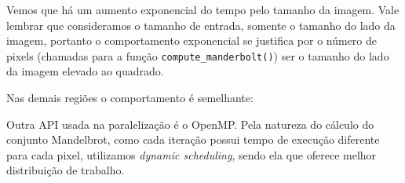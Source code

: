 \documentclass[12pt]{article}
\newcommand{\code}[1]{\texttt{#1}}
\begin{document}
Vemos que há um aumento exponencial do tempo pelo tamanho da imagem. Vale lembrar que consideramos o tamanho de entrada, somente o tamanho do lado da imagem, portanto o comportamento exponencial se justifica por o número de pixels (chamadas para a função \code{compute\_manderbolt()}) ser o tamanho do lado da imagem elevado ao quadrado.

Nas demais regiões o comportamento é semelhante:

\begin{figure}[H]
\end{figure}


Outra API usada na paralelização é o OpenMP. Pela natureza do cálculo do conjunto Mandelbrot, como cada iteração possui tempo de execução diferente para cada pixel, utilizamos \textit{dynamic scheduling}, sendo ela que oferece melhor distribuição de trabalho.
\end{document}
